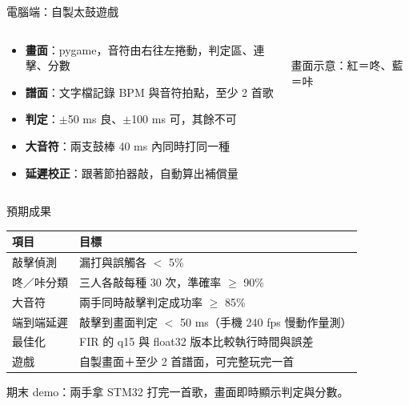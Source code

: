 \documentclass[aspectratio=169, 12pt]{beamer}
\begin{document}
\begin{frame}{電腦端：自製太鼓遊戲}
\begin{columns}[T]
\begin{column}{0.5\textwidth}
\begin{itemize}
  \item \textbf{畫面}：pygame，音符由右往左捲動，判定區、連擊、分數
  \item \textbf{譜面}：文字檔記錄 BPM 與音符拍點，至少 2 首歌
  \item \textbf{判定}：$\pm$50 ms 良、$\pm$100 ms 可，其餘不可
  \item \textbf{大音符}：兩支鼓棒 40 ms 內同時打同一種
  \item \textbf{延遲校正}：跟著節拍器敲，自動算出補償量
\end{itemize}
\end{column}
\begin{column}{0.46\textwidth}
\begin{center}
\\[0.5em]
{\scriptsize\color{quiet} 畫面示意：{\color{taikored}紅＝咚}、{\color{taikoblue}藍＝咔}}
\end{center}
\end{column}
\end{columns}
\end{frame}

\begin{frame}{預期成果}
\begingroup\small\begin{tabularx}{\textwidth}{@{}l Y@{}}
\toprule
項目 & 目標 \\
\midrule
敲擊偵測 & 漏打與誤觸各 $<$ 5\% \\
咚／咔分類 & 三人各敲每種 30 次，準確率 $\geq$ 90\% \\
大音符 & 兩手同時敲擊判定成功率 $\geq$ 85\% \\
端到端延遲 & 敲擊到畫面判定 $<$ 50 ms（手機 240 fps 慢動作量測） \\
最佳化 & FIR 的 q15 與 float32 版本比較執行時間與誤差 \\
遊戲 & 自製畫面＋至少 2 首譜面，可完整玩完一首 \\
\bottomrule
\end{tabularx}\endgroup
\vspace{0.8em}

{\small 期末 demo：兩手拿 STM32 打完一首歌，畫面即時顯示判定與分數。}
\end{frame}
\end{document}
